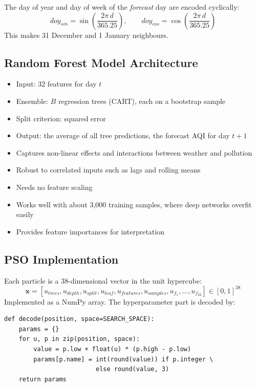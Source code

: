 The day of year and day of week of the \emph{forecast} day are encoded cyclically:
\begin{equation}
doy_{sin} = \sin\!\left(\frac{2\pi\, d}{365.25}\right), \qquad doy_{cos} = \cos\!\left(\frac{2\pi\, d}{365.25}\right)
\end{equation}
This makes 31 December and 1 January neighbours.

\subsection{Random Forest Model Architecture}

\begin{itemize}
\item Input: 32 features for day $t$
\item Ensemble: $B$ regression trees (CART), each on a bootstrap sample
\item Split criterion: squared error
\item Output: the average of all tree predictions, the forecast AQI for day $t+1$
\end{itemize}

\begin{itemize}
\item Captures non-linear effects and interactions between weather and pollution
\item Robust to correlated inputs such as lags and rolling means
\item Needs no feature scaling
\item Works well with about 3,000 training samples, where deep networks overfit easily
\item Provides feature importances for interpretation
\end{itemize}

\subsection{PSO Implementation}

Each particle is a 38-dimensional vector in the unit hypercube:
\begin{equation}
\mathbf{x} = [u_{trees}, u_{depth}, u_{split}, u_{leaf}, u_{features}, u_{samples}, u_{f_1}, \dots, u_{f_{32}}] \in [0,1]^{38}
\end{equation}
Implemented as a NumPy array. The hyperparameter part is decoded by:
\begin{verbatim}
def decode(position, space=SEARCH_SPACE):
    params = {}
    for u, p in zip(position, space):
        value = p.low + float(u) * (p.high - p.low)
        params[p.name] = int(round(value)) if p.integer \
                         else round(value, 3)
    return params
\end{verbatim}

